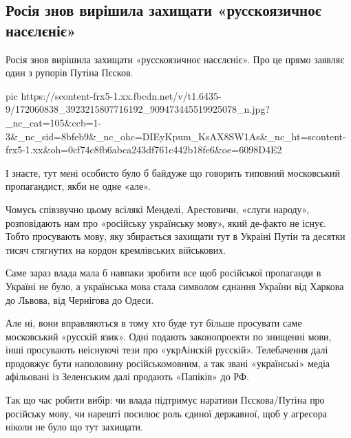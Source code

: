  
 
 
 
 
\subsection{Росія знов вирішила захищати «русскоязичноє насєлєніє»}

Росія знов вирішила захищати «русскоязичноє насєлєніє». Про це прямо заявляє
один з рупорів Путіна Пєсков.

\ifcmt
  pic https://scontent-frx5-1.xx.fbcdn.net/v/t1.6435-9/172060838_3923215807716192_909473445519925078_n.jpg?_nc_cat=105&ccb=1-3&_nc_sid=8bfeb9&_nc_ohc=DIEyKpum_KsAX8SW1As&_nc_ht=scontent-frx5-1.xx&oh=0cf74c8fb6abca243df761c442b18fe6&oe=6098D4E2
\fi

І знаєте, тут мені особисто було б байдуже що говорить типовний московський
пропагандист, якби не одне «але». 

Чомусь співзвучно цьому всілякі Менделі, Арестовичи, «слуги народу»,
розповідають нам про «російську українську мову», який де-факто не існує. Тобто
просувають мову, яку збирається захищати тут в Украіні Путін та десятки тисяч
стягнутих на кордон кремлівських військових. 

Саме зараз влада мала б навпаки зробити все щоб російської пропаганди в Україні
не було, а українська мова стала символом єднання України від Харкова до
Львова, від Чернігова до Одеси. 

Але ні, вони вправляються в тому хто буде тут більше просувати саме московський
«русскій язик». Одні подають законопроекти по знищенні мови, інші просувають
неіснуючі тези про «укрАінскій русскій». Телебачення далі продовжує бути
наполовину російськомовним, а так звані «українські» медіа афільовані із
Зеленським далі продають «Папіків» до РФ.

Так що час робити вибір: чи влада підтримує наративи Пєскова/Путіна про
російську мову, чи нарешті посилює роль єдиної державної, щоб у агресора ніколи
не було що тут захищати.
